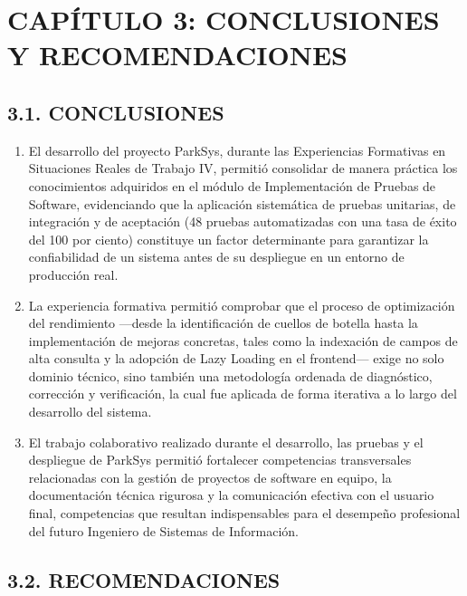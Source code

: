 \section{CAPÍTULO 3: CONCLUSIONES Y RECOMENDACIONES}

\subsection{3.1. CONCLUSIONES}

\begin{enumerate}
    \item El desarrollo del proyecto ParkSys, durante las Experiencias Formativas en Situaciones Reales de Trabajo IV, permitió consolidar de manera práctica los conocimientos adquiridos en el módulo de Implementación de Pruebas de Software, evidenciando que la aplicación sistemática de pruebas unitarias, de integración y de aceptación (48 pruebas automatizadas con una tasa de éxito del 100 por ciento) constituye un factor determinante para garantizar la confiabilidad de un sistema antes de su despliegue en un entorno de producción real.
    \item La experiencia formativa permitió comprobar que el proceso de optimización del rendimiento —desde la identificación de cuellos de botella hasta la implementación de mejoras concretas, tales como la indexación de campos de alta consulta y la adopción de Lazy Loading en el frontend— exige no solo dominio técnico, sino también una metodología ordenada de diagnóstico, corrección y verificación, la cual fue aplicada de forma iterativa a lo largo del desarrollo del sistema.
    \item El trabajo colaborativo realizado durante el desarrollo, las pruebas y el despliegue de ParkSys permitió fortalecer competencias transversales relacionadas con la gestión de proyectos de software en equipo, la documentación técnica rigurosa y la comunicación efectiva con el usuario final, competencias que resultan indispensables para el desempeño profesional del futuro Ingeniero de Sistemas de Información.
\end{enumerate}

\subsection{3.2. RECOMENDACIONES}

